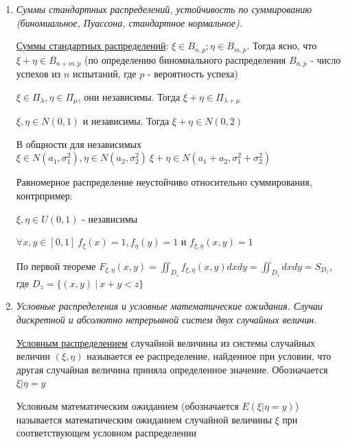 \documentclass[12pt]{article}
\begin{document}
\begin{enumerate}
    \hyperlink{convolutionformula}{Плотность суммы}: \Ths $\letsymbol \xi_1, \xi_2$ - независимые абсолютно непрерывные случайные величины с плотностями
    $f_{\xi_1}(x)$ и $f_{\xi_2}(y)$

    Тогда плотность суммы $\xi_1 + \xi_2$ равна $f_{\xi_1 + \xi_2}(t) = \int_{-\infty}^\infty 
    \underset{\text{т. н. свертка}}{\underbrace{f_{\xi_1}(x) f_{\xi_2}(t - x)}} dx$

    \item \textit{Суммы стандартных распределений, устойчивость по суммированию (биномиальное, Пуассона, стандартное нормальное).}

    \hyperlink{sumofstandarddistributions}{Суммы стандартных распределений}: 
     $\xi \in B_{n, p}; \eta \in B_{m, p}$. Тогда ясно, что $\xi + \eta \in B_{n + m, p}$ 
    (по определению биномиального распределения $B_{n, p}$ - число успехов из $n$ испытаний, где $p$ - вероятность успеха)

     $\xi \in \Pi_{\lambda}, \eta \in \Pi_{\mu}$, они независимы. Тогда $\xi + \eta \in \Pi_{\lambda + \mu}$

     $\xi, \eta \in N(0, 1)$ и независимы. Тогда $\xi + \eta \in N(0, 2)$

     В общности для независимых $\xi \in N(a_1, \sigma^2_1), \eta \in N(a_2, \sigma_2^2) \ \xi + \eta \in N(a_1 + a_2, \sigma_1^2 + \sigma_2^2)$ 

     Равномерное распределение неустойчиво относительно суммирования, контрпример:

    $\xi, \eta \in U(0, 1)$ - независимы

    $\forall x, y \in [0, 1] \ f_{\xi}(x) = 1, f_\eta(y) = 1$ и $f_{\xi, \eta}(x, y) = 1$

    По первой теореме $F_{\xi, \eta}(x, y) = \iint_{D_z} f_{\xi, \eta}(x, y) dxdy = \iint_{D_z} dxdy = S_{D_z}$, где $D_z = \{(x, y) \ | \ x + y < z\}$

    \item \textit{Условные распределения и условные математические ожидания. Случаи дискретной и абсолютно непрерывной систем двух случайных величин.}

    \hyperlink{conditionaldistribution}{Условным распределением} случайной величины из системы случайных величин $(\xi, \eta)$ 
    называется ее распределение, найденное при условии, что другая случайная величина приняла 
    определенное значение. Обозначается $\xi | \eta = y$

    Условным математическим ожиданием (обозначается $E(\xi | \eta = y)$) называется 
    математическим ожиданием случайной величины $\xi$ при соответствующем условном распределении
 

\end{enumerate}
\end{document}
